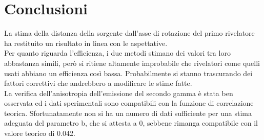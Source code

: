 \section{Conclusioni}

La stima della distanza della sorgente dall'asse di rotazione del primo rivelatore ha restituito un risultato in linea con le aspettative.\\

Per quanto riguarda l'efficienza, i due metodi stimano dei valori tra loro abbastanza simili, però si ritiene altamente improbabile che rivelatori come quelli usati abbiano un efficienza così bassa. Probabilmente si stanno trascurando dei fattori correttivi che andrebbero a modificare le stime fatte.\\

La verifica dell'anisotropia dell'emissione del secondo gamma è stata ben osservata ed i dati sperimentali sono compatibili con la funzione di correlazione teorica. Sfortunatamente non si ha un numero di dati sufficiente per una stima adeguata del parametro b, che si attesta a 0, sebbene rimanga compatibile con il valore teorico di 0.042.
